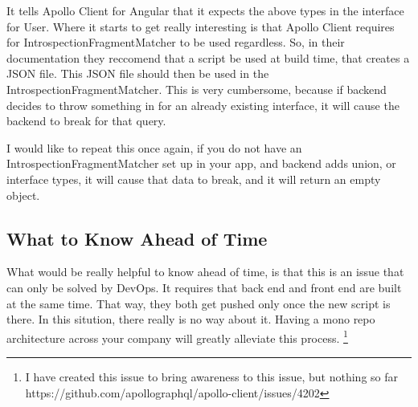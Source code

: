 It tells Apollo Client for Angular that it expects the above types in the
interface for User. Where it starts to get really interesting is that Apollo
Client requires for IntrospectionFragmentMatcher to be used regardless. So, in
their documentation they reccomend that a script be used at build time, that
creates a JSON file. This JSON file should then be used in the
IntrospectionFragmentMatcher. This is very cumbersome, because if backend
decides to throw something in for an already existing interface, it will cause
the backend to break for that query.

I would like to repeat this once again, if you do not have an
IntrospectionFragmentMatcher set up in your app, and backend adds union, or
interface types, it will cause that data to break, and it will return an empty
object.


\subsection{ What to Know Ahead of Time }
What would be really helpful to know ahead of time, is that this is an issue
that can only be solved by DevOps. It requires that back end and front end are
built at the same time. That way, they both get pushed only once the new script
is there. In this sitution, there really is no way about it. Having a mono repo
architecture across your company will greatly alleviate this process.
\footnote{I have created this issue to bring awareness to this issue, but nothing so far https://github.com/apollographql/apollo-client/issues/4202}
